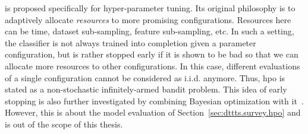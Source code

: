 \begin{remark}
\begin{leftbar}[remarkbar]
\Hyperband is proposed specifically for hyper-parameter tuning. Its original philosophy is to adaptively allocate \emph{resources} to more promising configurations. Resources here can be time, dataset sub-sampling, feature sub-sampling, etc. In such a setting, the classifier is not always trained into completion given a parameter configuration, but is rather stopped early if it is shown to be bad so that we can allocate more resources to other configurations. In this case, different evaluations of a single configuration cannot be considered as i.i.d. anymore. Thus, \gls{hpo} is stated as a non-stochastic infinitely-armed bandit problem. This idea of early stopping is also further investigated by combining Bayesian optimization with it~\citep{falkner2018bohb}. However, this is about the model evaluation of Section~\ref{sec:dttts.survey.hpo} and is out of the scope of this thesis.
\end{leftbar}
\end{remark}
